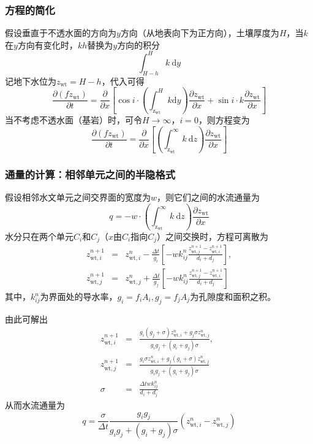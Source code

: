 \subsubsection{方程的简化}
假设垂直于不透水面的方向为$y$方向（从地表向下为正方向），土壤厚度为$H$，当$k$在$y$方向有变化时，$kh$替换为$y$方向的积分
\begin{equation}
  \int^H_{H-h} k \  \mathrm{d}y
\end{equation}
记地下水位为$z_{\mathrm{wt}}=H-h$，代入可得
\begin{equation}
  \frac{\partial \left(fz_{\mathrm{wt}}\right)}{\partial t} = \frac{\partial}{\partial x} \left[ \cos i \cdot \left(\int^{H}_{\mathrm{z_{wt}}} k \mathrm{d}y\right)\frac{\partial z_{\mathrm{wt}}}{\partial x} +\sin i\cdot k\frac{\partial z_{\mathrm{wt}}}{\partial x}\right]
\end{equation}
当不考虑不透水面（基岩）时，可令$H\to \infty$，$i=0$，则方程变为
\begin{equation}
  \frac{\partial \left(fz_{\mathrm{wt}}\right)}{\partial t} = \frac{\partial}{\partial x} \left[ \left(\int^\infty_{\mathrm{z_{wt}}} k\ \mathrm{d}z\right)\frac{\partial z_{\mathrm{wt}}}{\partial x} \right]
\end{equation}

\subsubsection{通量的计算：相邻单元之间的半隐格式}
假设相邻水文单元之间交界面的宽度为$w$，则它们之间的水流通量为
$$q=-w\cdot \left(\int^\infty_{\mathrm{z_{wt}}} k\ \mathrm{d}z\right)\frac{\partial z_{\mathrm{wt}}}{\partial x} $$
水分只在两个单元$C_i$和$C_j$（$x$由$C_i$指向$C_j$）之间交换时，方程可离散为
\begin{eqnarray}
  z_{\mathrm{wt},i}^{n+1} &=& z_{\mathrm{wt},i}^{n} - \frac{\Delta t}{g_i}\left[ -  w k^n_{ij} \frac{z_{\mathrm{wt},j}^{n+1} - z_{\mathrm{wt},i}^{n+1}}{d_i+d_j} \right], \\
  z_{\mathrm{wt},j}^{n+1} &=& z_{\mathrm{wt},j}^{n} + \frac{\Delta t}{g_j}\left[ -  w k^n_{ij} \frac{z_{\mathrm{wt},j}^{n+1} - z_{\mathrm{wt},i}^{n+1}}{d_i+d_j} \right]
\end{eqnarray}
其中，$k^n_{ij}$为界面处的导水率，$g_i=f_iA_i,g_j=f_jA_j$为孔隙度和面积之积。

由此可解出
\begin{eqnarray}
  z_{\mathrm{wt},i}^{n+1} &=& \frac{g_i\left(g_j+\sigma\right)z_{\mathrm{wt},i}^{n} +g_j\sigma z_{\mathrm{wt},j}^{n}}{g_ig_j+\left(g_i+g_j\right)\sigma},\\
  z_{\mathrm{wt},j}^{n+1} &=& \frac{g_i\sigma z_{\mathrm{wt},i}^{n} +g_j\left(g_i+\sigma\right)z_{\mathrm{wt},j}^{n}}{g_ig_j+\left(g_i+g_j\right)\sigma}\quad \\
  \sigma &=& \frac{\Delta t wk_{ij}^n}{d_i+d_j}
\end{eqnarray}
从而水流通量为
\begin{equation}\label{formula:subsurface_lateral_flow}
  q = \frac{\sigma}{\Delta t} \frac{g_ig_j}{g_ig_j+\left(g_i+g_j\right)\sigma} \left( z_{\mathrm{wt},i}^{n} - z_{\mathrm{wt},j}^{n} \right)
\end{equation}

